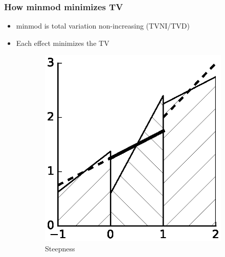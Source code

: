 \documentclass[11pt]{beamer}
\begin{document}
\begin{frame}
  \frametitle{How minmod minimizes TV}
  \begin{itemize}
  \item minmod is total variation non-increasing (TVNI/TVD)
  \item Each effect minimizes the TV
  \end{itemize}
  \begin{figure}[h]
    \centering
    \begin{subfigure}{0.3\textwidth}
      \centering
      \includegraphics[width=\textwidth]{figures/minmod/steepness}
      \caption{Steepness}
    \end{subfigure}
    \hfill
    \begin{subfigure}{0.3\textwidth}
      \centering

\end{subfigure}
\end{figure}
\end{frame}
\end{document}
